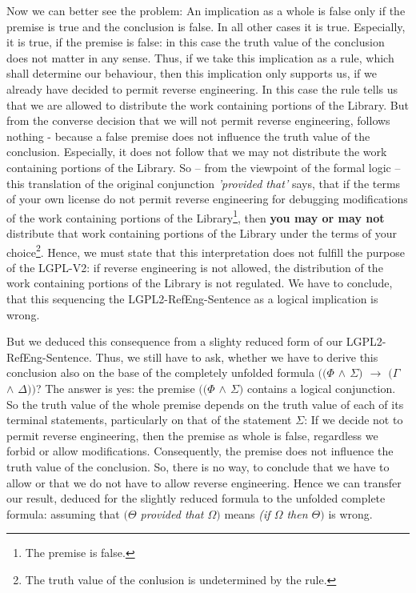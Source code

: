 Now we can better see the problem: An implication as a whole is false only if
the premise is true and the conclusion is false. In all other cases it is true.
Especially, it is true, if the premise is false: in this case the truth value of
the conclusion does not matter in any sense. Thus, if we take this implication
as a rule, which shall determine our behaviour, then this implication only
supports us, if we already have decided to permit reverse engineering. In this
case the rule tells us that we are allowed to distribute the work containing
portions of the Library. But from the converse decision that we will not permit
reverse engineering, follows nothing - because a false premise does not
influence the truth value of the conclusion. Especially, it does not follow that
we may not distribute the work containing portions of the Library. So -- from
the viewpoint of the formal logic -- this translation of the original
conjunction \emph{'provided that'} says, that if the terms of your own license
do not permit reverse engineering for debugging modifications of the work
containing portions of the Library\footnote{The premise is false.}, then
\textbf{you may or may not} distribute that work containing portions of the
Library under the terms of your choice\footnote{The truth value of the conlusion
is undetermined by the rule.}.
Hence, we must state that this interpretation does not fulfill the purpose of
the LGPL-V2: if reverse engineering is not allowed, the distribution of the work
containing portions of the Library is not regulated. We have to conclude, that
this sequencing the LGPL2-RefEng-Sentence as a logical implication is wrong.

But we deduced this consequence from a slighty reduced form of our
LGPL2-RefEng-Sentence. Thus, we still have to ask, whether we have to derive
this conclusion also on the base of the completely unfolded formula
\emph{$((\Phi$ $\wedge$ $\Sigma)$ $\rightarrow$ $(\Gamma$ $\wedge$ $\Delta))$}?
The answer is yes: the premise \emph{$((\Phi$ $\wedge$ $\Sigma)$} contains a
logical conjunction. So the truth value of the whole premise depends on the
truth value of each of its terminal statements, particularly on that of the
statement $\Sigma$: If we decide not to permit reverse engineering, then the
premise as whole is false, regardless we forbid or allow modifications.
Consequently, the premise does not influence the truth value of the conclusion.
So, there is no way, to conclude that we have to allow or that we do not have to
allow reverse engineering. Hence we can transfer our result, deduced for the
slightly reduced formula to the unfolded complete formula: assuming that
\emph{$(\Theta$ provided that $\Omega)$} means \emph{(if $\Omega$ then
$\Theta)$} is wrong.

